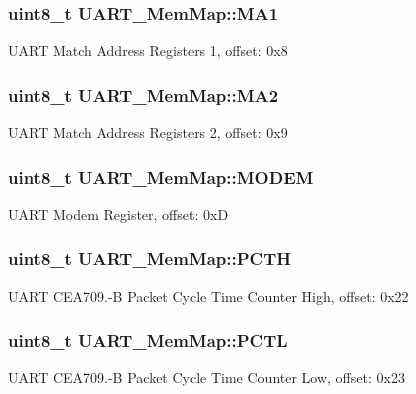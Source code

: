 \subsubsection[{M\+A1}]{\setlength{\rightskip}{0pt plus 5cm}uint8\+\_\+t U\+A\+R\+T\+\_\+\+Mem\+Map\+::\+M\+A1}\label{struct_u_a_r_t___mem_map_a0150c1ad073843276caf61c950794c17}
U\+A\+R\+T Match Address Registers 1, offset\+: 0x8 \hypertarget{struct_u_a_r_t___mem_map_ab6612fcc8e4f43ebae15982f6da2b567}{}
\subsubsection[{M\+A2}]{\setlength{\rightskip}{0pt plus 5cm}uint8\+\_\+t U\+A\+R\+T\+\_\+\+Mem\+Map\+::\+M\+A2}\label{struct_u_a_r_t___mem_map_ab6612fcc8e4f43ebae15982f6da2b567}
U\+A\+R\+T Match Address Registers 2, offset\+: 0x9 \hypertarget{struct_u_a_r_t___mem_map_a2eb889dcd179b02f46cf67c98792e130}{}
\subsubsection[{M\+O\+D\+E\+M}]{\setlength{\rightskip}{0pt plus 5cm}uint8\+\_\+t U\+A\+R\+T\+\_\+\+Mem\+Map\+::\+M\+O\+D\+E\+M}\label{struct_u_a_r_t___mem_map_a2eb889dcd179b02f46cf67c98792e130}
U\+A\+R\+T Modem Register, offset\+: 0x\+D \hypertarget{struct_u_a_r_t___mem_map_a0904d07dd04480437976c762855eea35}{}
\subsubsection[{P\+C\+T\+H}]{\setlength{\rightskip}{0pt plus 5cm}uint8\+\_\+t U\+A\+R\+T\+\_\+\+Mem\+Map\+::\+P\+C\+T\+H}\label{struct_u_a_r_t___mem_map_a0904d07dd04480437976c762855eea35}
U\+A\+R\+T C\+E\+A709.-\/\+B Packet Cycle Time Counter High, offset\+: 0x22 \hypertarget{struct_u_a_r_t___mem_map_ab238ef6c9d2d68fb2d905ee901e63717}{}
\subsubsection[{P\+C\+T\+L}]{\setlength{\rightskip}{0pt plus 5cm}uint8\+\_\+t U\+A\+R\+T\+\_\+\+Mem\+Map\+::\+P\+C\+T\+L}\label{struct_u_a_r_t___mem_map_ab238ef6c9d2d68fb2d905ee901e63717}
U\+A\+R\+T C\+E\+A709.-\/\+B Packet Cycle Time Counter Low, offset\+: 0x23 \hypertarget{struct_u_a_r_t___mem_map_a6ad16328066eeb949b4ee3d4a67776be}{}

